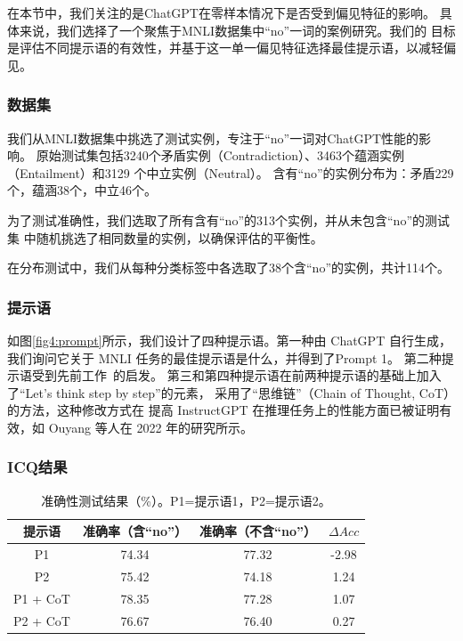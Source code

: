 在本节中，我们关注的是ChatGPT在零样本情况下是否受到偏见特征的影响。
具体来说，我们选择了一个聚焦于MNLI数据集中``no''一词的案例研究。我们的
目标是评估不同提示语的有效性，并基于这一单一偏见特征选择最佳提示语，以减轻偏见。

\subsubsection*{数据集}
\label{sec3:chatgptdata}
我们从MNLI数据集中挑选了测试实例，专注于``no''一词对ChatGPT性能的影响。
原始测试集包括3240个矛盾实例（Contradiction）、3463个蕴涵实例（Entailment）和3129
个中立实例（Neutral）。
含有``no''的实例分布为：矛盾229个，蕴涵38个，中立46个。

为了测试准确性，我们选取了所有含有``no''的313个实例，并从未包含``no''的测试集
中随机挑选了相同数量的实例，以确保评估的平衡性。

在分布测试中，我们从每种分类标签中各选取了38个含``no''的实例，共计114个。

\subsubsection*{提示语}
如图\ref{fig4:prompt}所示，我们设计了四种提示语。第一种由 ChatGPT 自行生成，
我们询问它关于 MNLI 任务的最佳提示语是什么，并得到了Prompt 1。
第二种提示语受到先前工作~\cite{qin2023chatgpt}的启发。
第三和第四种提示语在前两种提示语的基础上加入了``Let’s think step by step''\cite{kojima2022large}的元素，
采用了``思维链''（Chain of Thought, CoT）的方法，这种修改方式在
提高 InstructGPT 在推理任务上的性能方面已被证明有效，如 Ouyang 等人在 2022 年的研究\cite{ouyang2022training}所示。


\subsubsection*{ICQ结果}
\label{sec3:chatgptacc}

\begin{table}[th]
\centering
\scriptsize
\begin{tabular}{c|ccc}
\toprule
\textbf{提示语} & 准确率（含``no''） & 准确率（不含``no''） & $\Delta Acc$ \\ \midrule
P1  & 74.34& 77.32& -2.98   \\ \hline
P2&  75.42& 74.18 & 1.24 \\ \hline
P1 + CoT  & 78.35& 77.28&1.07  \\ \hline
P2 + CoT&  76.67& 76.40&  0.27 \\ \hline
 \bottomrule
\end{tabular}
\caption{准确性测试结果（\%）。P1=提示语1，P2=提示语2。}
\label{tab4:accuracy}
\end{table}

